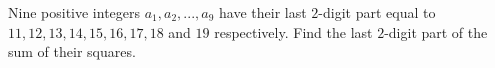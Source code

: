 Nine positive integers $a_1,a_2,...,a_9$ have their last $2$-digit part equal to $11,12,13,14,15,16,17,18$ and $19$ respectively. Find the last $2$-digit part of the sum of their squares.